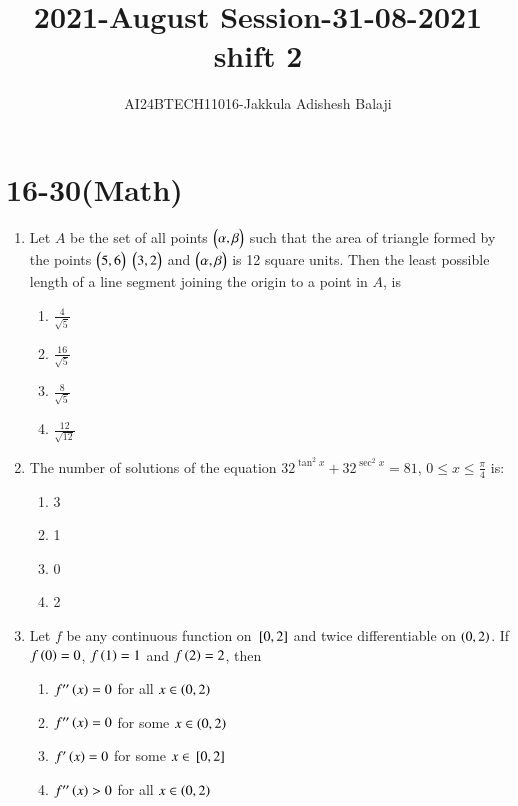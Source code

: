 \documentclass[journal]{IEEEtran}
\begin{document}

\title{2021-August Session-31-08-2021 shift 2}
\author{AI24BTECH11016-Jakkula Adishesh Balaji}
{\let\newpage\relax\maketitle}
\renewcommand{\thefigure}{\theenumi}
\renewcommand{\thetable}{\theenumi}
\setlength{\intextsep}{10pt} %
\renewcommand{\thetable}{\theenumi}
\section{16-30(Math)}
\begin{enumerate}
	\item
	Let $A$ be the set of all points $\begin{pmatrix}\alpha , \beta\end{pmatrix}$ such that the area of triangle formed by the points $\begin{pmatrix}5 , 6\end{pmatrix}$ $\begin{pmatrix}3 , 2\end{pmatrix}$ and $\begin{pmatrix}\alpha , \beta\end{pmatrix}$ is 12 square units. Then the least possible length of a line segment joining the origin to a point in $A$, is 
		\begin{enumerate}
			\item  $\frac{4}{\sqrt{5}}$
			\item  $\frac{16}{\sqrt{5}}$
			\item  $\frac{8}{\sqrt{5}}$
			\item  $\frac{12}{\sqrt{12}}$
		\end{enumerate}
	\item
	The number of solutions of the equation $32^{\tan^{2}{x}} + 32^{\sec^{2}{x}} = 81$, $0 \leq x \leq \frac{\pi}{4}$ is:
		\begin{enumerate}
			\item 3
			\item 1
			\item 0
			\item 2
		\end{enumerate}
	\item 
	Let $f$ be any continuous function on ${}\left[0, 2\right]$ and twice differentiable on $\left(0, 2\right)$. If $f\left(0\right) = 0$, $f\left(1\right) = 1$ and $f\left(2\right) = 2$, then
		\begin{enumerate}
			\item  $f^{\prime\prime}\left(x\right) = 0$ for all $x \in \left(0, 2\right)$
			\item  $f^{\prime\prime}\left(x\right) = 0$ for some $x \in \left(0, 2\right)$
			\item  $f^{\prime}\left(x\right) = 0$ for some $x \in {}\left[0, 2\right]$
			\item  $f^{\prime\prime}\left(x\right) > 0$ for all $x \in \left(0, 2\right)$

\end{enumerate}
\end{enumerate}
\end{document}
